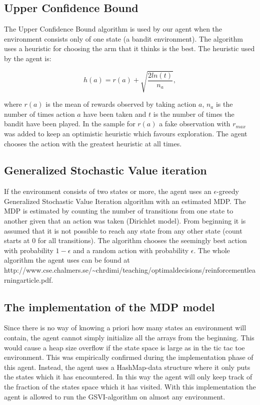 \documentclass[11pt]{article}
\numberwithin{equation}{section}
\begin{document}
\begin{flushleft}
\subsection{Upper Confidence Bound}

The Upper Confidence Bound algorithm is used by our agent when the environment consists only of one state (a bandit environment). The algorithm uses a heuristic for choosing the arm that it thinks is the best. The heuristic used by the agent is:

$$h(a) = r(a) + \sqrt{\frac{2ln(t)}{n_a}},$$

where $r(a)$ is the mean of rewards observed by taking action $a$, $n_a$ is the number of times action $a$ have been taken and $t$ is the number of times the bandit have been played. In the sample for $r(a)$ a fake observation with $r_{max}$ was added to keep an optimistic heuristic which favours exploration. The agent chooses the action with the greatest heuristic at all times.

\subsection{Generalized Stochastic Value iteration}

If the environment consists of two states or more, the agent uses an $\epsilon$-greedy Generalized Stochastic Value Iteration algorithm with an estimated MDP. The MDP is estimated by counting the number of transitions from one state to another given that an action was taken (Dirichlet model). From beginning it is assumed that it is not possible to reach any state from any other state (count starts at 0 for all transitions). The algorithm chooses the seemingly best action with probability $1-\epsilon$ and a random action with probability $\epsilon$. The whole algorithm the agent uses can be found at http://www.cse.chalmers.se/\textasciitilde chrdimi/teaching/optimal\textunderscore decisions/reinforcement\textunderscore learning\textunderscore article.pdf.

\subsection{The implementation of the MDP model}

Since there is no way of knowing a priori how many states an environment will contain, the agent cannot simply initialize all the arrays from the beginning. This would cause a heap size overflow if the state space is large as in the tic tac toe environment. This was empirically confirmed during the implementation phase of this agent. Instead, the agent uses a HashMap-data structure where it only puts the states which it has encountered. In this way the agent will only keep track of the fraction of the states space which it has visited. With this implementation the agent is allowed to run the GSVI-algorithm on almost any environment.  


\end{flushleft}
\end{document}
